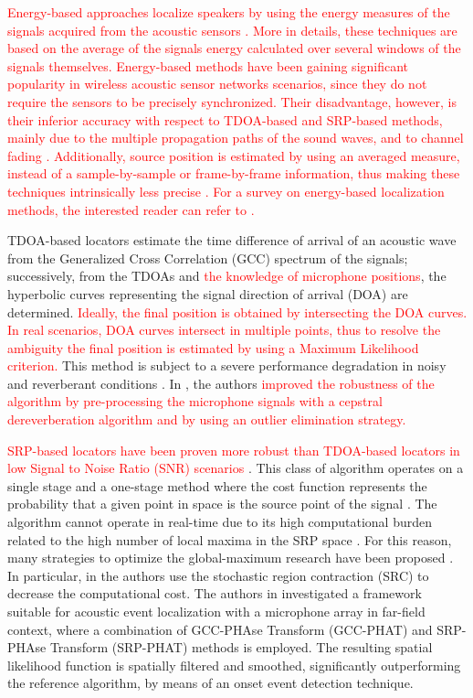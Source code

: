 \documentclass[review]{elsarticle}
\begin{document}
\textcolor{red}{Energy-based approaches localize speakers by using the energy measures of the signals acquired from the acoustic sensors \cite{Cobos2017,Meng2017}. More in details, these techniques are based on the average of the signals energy calculated over several windows of the signals themselves. Energy-based methods have been gaining significant popularity in wireless acoustic sensor networks scenarios, since they do not require the sensors to be precisely synchronized. Their disadvantage, however, is their inferior accuracy with respect to TDOA-based and SRP-based methods, mainly due to the multiple propagation paths of the sound waves, and to channel fading \cite{Cobos2017}. Additionally, source position is estimated by using an averaged measure, instead of a sample-by-sample or frame-by-frame information, thus making these techniques intrinsically less precise \cite{Cobos2017}. For a survey on energy-based localization methods, the interested reader can refer to \cite{Cobos2017,Meng2017}.}

TDOA-based locators estimate the time difference of arrival of an acoustic wave from the Generalized Cross Correlation (GCC) spectrum of the signals; successively, from the TDOAs and \textcolor{red}{the knowledge of microphone positions}, the hyperbolic curves representing the signal direction of arrival (DOA) are determined. \textcolor{red}{Ideally, the final position is obtained by intersecting the DOA curves. In real scenarios, DOA curves intersect in multiple points, thus to resolve the ambiguity the final position is estimated by using a Maximum Likelihood criterion.}  This method is subject to a severe performance degradation in noisy and reverberant conditions \cite{champagne1996performance}. In \cite{tsiami2014experiments}, the authors \textcolor{red}{improved the robustness of the algorithm by pre-processing the microphone signals with a cepstral dereverberation algorithm and by using an outlier elimination strategy.}

\textcolor{red}{
SRP-based locators have been proven more robust than TDOA-based locators in low Signal to Noise Ratio (SNR) scenarios \cite{Dibiase2001Robust}}. This class of algorithm operates on a single stage and a one-stage method where the cost function represents the probability that a given point in space is the source point of the signal \cite{brutti2007classification}. The algorithm cannot operate in real-time due to its high computational burden related to the high number of local maxima in the SRP space \cite{yook2016fast}. For this reason, many strategies to optimize the global-maximum research have been proposed \cite{DoSY07,Minotto2012,Lee2016}. In particular, in \cite{DoSY07} the authors use the stochastic region contraction (SRC) to decrease the computational cost. The authors in \cite{transfeld2015acoustic} investigated a framework  suitable for acoustic event localization with a microphone array in far-field context, where a combination of GCC-PHAse Transform (GCC-PHAT) and SRP-PHAse Transform (SRP-PHAT) methods is employed. The resulting spatial likelihood function is spatially filtered and smoothed, significantly outperforming the reference algorithm, by means of an onset event detection technique. 
\end{document}
